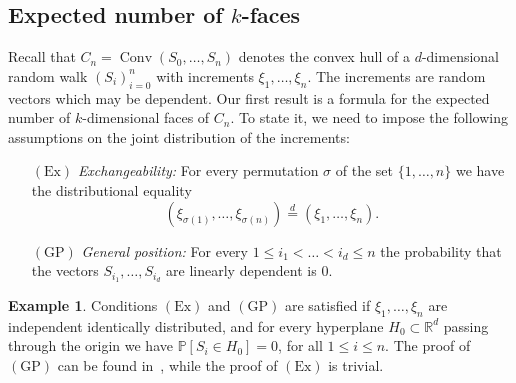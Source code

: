 \documentclass[12pt, reqno]{amsart}
\theoremstyle{plain}
\theoremstyle{definition}
\newtheorem{example}[theorem]{Example}
\theoremstyle{remark}
\begin{document}
\subsection{Expected number of \texorpdfstring{$k$}{k}-faces}
Recall that $C_n= {\mathop{\mathrm{Conv}}\nolimits}(S_0,\ldots,S_n)$ denotes the convex hull of a $d$-dimensional random walk $(S_i)_{i=0}^n$ with increments $\xi_1,\ldots,\xi_n$. The increments are random vectors which may be dependent. Our first result is a formula for the expected number of $k$-dimensional faces  of $C_n$.
To state it, we need to impose the following assumptions on the joint distribution of  the increments: 
\begin{enumerate}
\item[$(\text{Ex})$] \textit{Exchangeability:} For every permutation $\sigma$ of the set $\{1,\ldots,n\}$ we have the distributional equality
$$
(\xi_{\sigma(1)},\ldots,  \xi_{\sigma(n)}) {\stackrel{d}{=}} (\xi_1,\ldots,\xi_n).
$$
\item[$(\text{GP})$] \textit{General position:}
For every $1\leq i_1 < \ldots < i_d\leq n$ the probability that the vectors $S_{i_1}, \ldots,S_{i_d}$ are linearly dependent is $0$.
\end{enumerate}

\begin{example}
Conditions $(\text{Ex})$ and $(\text{GP})$ are satisfied if $\xi_1,\ldots,\xi_n$ are independent identically distributed, and for every hyperplane $H_0\subset {\mathbb{R}}^d$ passing through the origin we have ${\mathbb{P}}[S_i\in H_0] = 0$, for all $1\leq i\leq n$. The proof of $(\text{GP})$ can be found in~\cite{KVZ16_arcsine}, while the proof of $(\text{Ex})$ is trivial.
\end{example}
\end{document}
